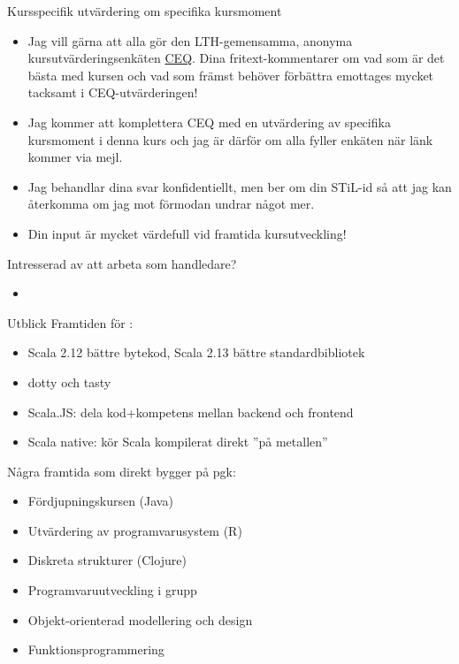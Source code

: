 \begin{Slide}{Kursspecifik utvärdering om specifika kursmoment}\SlideFontSmall
\begin{itemize}
\item Jag vill gärna att alla gör den LTH-gemensamma, anonyma kursutvärderingsenkäten \href{https://www.ceq.lth.se/}{CEQ}. Dina fritext-kommentarer om vad som är det bästa med kursen och vad som främst behöver förbättra emottages mycket tacksamt i CEQ-utvärderingen!
\item Jag kommer att komplettera CEQ med en  utvärdering av specifika kursmoment i denna kurs och jag är därför  om alla fyller enkäten när länk kommer via mejl. 
\item Jag behandlar dina svar konfidentiellt, men ber om din STiL-id så att jag kan återkomma om jag mot förmodan undrar något mer.
\item Din input är mycket värdefull vid framtida kursutveckling!
\end{itemize}
\end{Slide}

\begin{Slide}{Intresserad av att arbeta som handledare?}\SlideFontSmall
\begin{itemize}
\item 
\end{itemize}
\end{Slide}

\begin{Slide}{Utblick}\SlideFontSmall
Framtiden för :
\begin{itemize}
\item Scala 2.12 bättre bytekod, Scala 2.13 bättre standardbibliotek
\item dotty och tasty
\item Scala.JS: dela kod+kompetens mellan backend och frontend
\item Scala native: kör Scala kompilerat direkt ''på metallen''
\end{itemize}
Några framtida  som direkt bygger på pgk:
\begin{itemize}
\item Fördjupningskursen (Java)
\item Utvärdering av programvarusystem (R)
\item Diskreta strukturer (Clojure)
\item Programvaruutveckling i grupp 
\item Objekt-orienterad modellering och design
\item Funktionsprogrammering 
\end{itemize}

\end{Slide}


